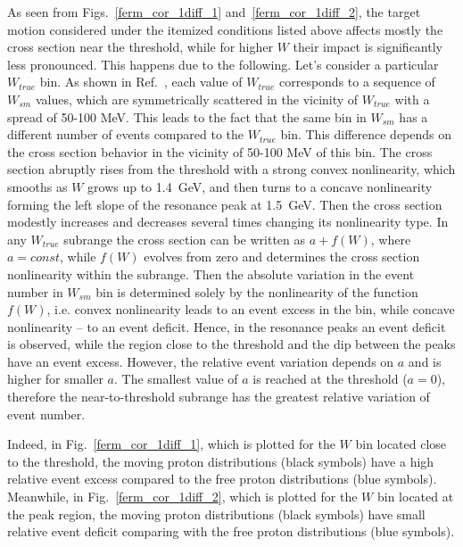 As seen from Figs.~\ref{ferm_cor_1diff_1} and~\ref{ferm_cor_1diff_2}, the target motion considered under the itemized conditions listed above affects mostly the cross section near the threshold, while for higher $W$ their impact is significantly less pronounced. This happens due to the following. Let's consider a particular $W_{true}$ bin. As shown in Ref.~\cite{twopeg-d}, each value of $W_{true}$ corresponds to a sequence of $W_{sm}$ values, which are symmetrically scattered in the vicinity of $W_{true}$ with a spread of 50-100 MeV. This leads to the fact that the same bin in $W_{sm}$ has a different number of events compared to the $W_{true}$ bin. This difference depends on the cross section behavior in the vicinity of 50-100 MeV of this bin. The cross section abruptly rises from the threshold with a strong convex nonlinearity, which smooths as $W$ grows up to 1.4~GeV, and then turns to a concave nonlinearity forming the left slope of the resonance peak at 1.5~GeV. Then the cross section modestly increases and decreases several times changing its nonlinearity type. In any $W_{true}$ subrange the cross section can be written as $a + f(W)$, where $a=const$, while $f(W)$ evolves from zero and determines the cross section nonlinearity within the subrange.  Then the absolute variation in the event number in $W_{sm}$ bin is determined solely by the nonlinearity of the function $f(W)$, i.e. convex nonlinearity leads to an event excess in the bin, while concave nonlinearity -- to an event deficit. Hence, in the resonance peaks an event deficit is observed, while the region close to the threshold and the dip between the peaks have an event excess. However, the relative event variation depends on $a$ and is higher for smaller $a$. The smallest value of $a$ is reached at the threshold ($a = 0$), therefore the near-to-threshold subrange has the greatest relative variation of event number.



Indeed, in Fig.~\ref{ferm_cor_1diff_1}, which is plotted for the $W$ bin located close to the threshold, the moving proton distributions (black symbols) have a high relative event excess compared to the free proton distributions (blue symbols). Meanwhile, in Fig.~\ref{ferm_cor_1diff_2}, which is plotted for the $W$ bin located at the peak region, the moving proton distributions (black symbols) have small relative event deficit comparing with the free proton distributions (blue symbols). 

